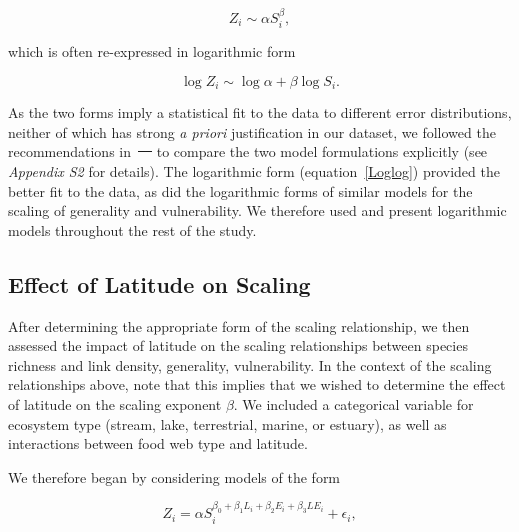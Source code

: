 \documentclass[12pt]{article}
\providecommand{\DIFadd}[1]{{\protect\color{blue}\uwave{#1}}} %
\providecommand{\DIFdel}[1]{{\protect\color{red}\sout{#1}}}                      %
\providecommand{\DIFaddbegin}{} %
\providecommand{\DIFaddend}{} %
\providecommand{\DIFdelbegin}{} %
\providecommand{\DIFdelend}{} %
\begin{document}
    \begin{equation}
    \label{Power}
    Z_{i} \sim \alpha S_{i}^{\beta}  ,
    \end{equation}

    \noindent which is often re-expressed in logarithmic form 

    \begin{equation}
    \label{Loglog}
    \log{Z_{i}} \sim \log{\alpha} + \beta\log{S_{i}}  .
    \end{equation}

    \noindent As the two forms imply a statistical fit to the data to different error 
    distributions, neither of which has strong
    \emph{a priori} justification in our dataset, we followed the recommendations in~\DIFdelbegin \DIFdel{\mbox{%
\citet{Xiao2011}
}%
}\DIFdelend \DIFaddbegin \DIFadd{\mbox{%
\cite{Xiao2011}
}%
}\DIFaddend to compare the two model formulations explicitly (see \emph{Appendix S2} for details). 
    The logarithmic form (equation~\ref{Loglog}) provided the better fit to the data,
    as did the logarithmic forms of similar models for the scaling of generality and vulnerability. 
    We therefore used and present logarithmic models throughout the rest of the study.


  \subsection*{Effect of Latitude on Scaling}


\DIFdelbegin %

\DIFdelend After determining the appropriate form of the scaling relationship, we
    then assessed the impact of latitude on the scaling relationships between
    species richness and link density, generality, vulnerability. In the
    context of the scaling relationships above, note  that this implies that
    we wished to determine the effect of latitude on the scaling exponent
    $\beta$. We included a categorical variable for
    ecosystem type (stream, lake,  terrestrial, marine, or estuary), as well
    as interactions between food web type and latitude.


    We therefore began by considering models of the form

    \begin{equation}
    \label{PowerLat}
    Z_{i}=\alpha S_{i}^{\beta_{0}+\beta_{1}L_{i}+\beta_{2}E_{i}+\beta_{3}LE_{i}} + \epsilon_{i} ,
    \end{equation}
\end{document}
